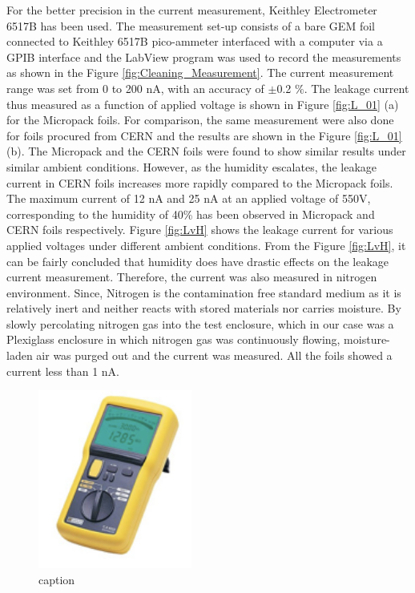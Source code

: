 For the better precision in the current measurement, Keithley Electrometer 6517B \cite{thirteen} has been used. 
The measurement set-up consists of a bare GEM foil connected to Keithley 6517B pico-ammeter interfaced with a computer via a GPIB interface and the LabView program was used to record the measurements as shown in the Figure \ref{fig:Cleaning_Measurement}. The current measurement range was set from 0 to 200 nA, with an accuracy of $\pm$0.2 $\%$.
The leakage current thus measured as a function of applied voltage is shown in Figure \ref{fig:L_01} (a) for the Micropack foils.
For comparison, the same measurement were also done for foils procured from CERN and the results are shown in the Figure \ref{fig:L_01} (b).  
The Micropack and the CERN foils were found to show similar results under similar ambient conditions.
However, as the humidity escalates, the leakage current in CERN foils increases more rapidly compared to the Micropack foils.
The maximum current of 12 nA and 25 nA at an applied voltage of 550V, corresponding to the humidity of 40\% has been observed in Micropack and CERN foils respectively. Figure \ref{fig:LvH} shows the leakage current for various applied voltages under different ambient conditions.
From the Figure \ref{fig:LvH}, it can be fairly concluded that humidity does have drastic effects on the leakage current measurement.
Therefore, the current was also measured in nitrogen environment. Since, Nitrogen is the contamination free standard medium as it is relatively inert and neither reacts with stored materials nor carries moisture.
By slowly percolating nitrogen gas into the test enclosure, which in our case was a Plexiglass enclosure in which nitrogen gas was continuously flowing, moisture-laden air was purged out and the current was measured. All the foils showed a current less than 1 nA.
\begin{figure}[!htbp]
	\centering
	\includegraphics[width=0.45\textwidth]{figures/GEM/megger.png}
	\caption{caption}
	\label{fig:label}
\end{figure}
